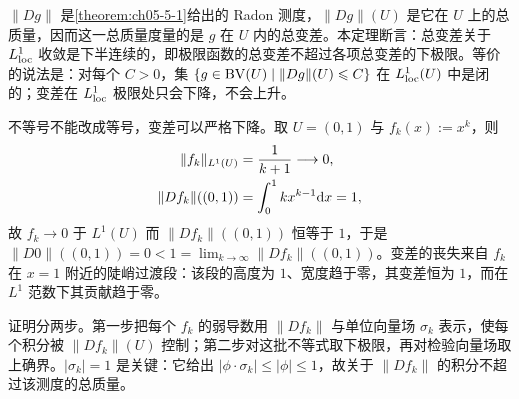 \documentclass[../../main.tex]{subfiles}%
\begin{document}
\begin{remark}\label{remark:ch05-thm-5-2-动机}
$\lVert Dg\rVert$ 是\cref{theorem:ch05-5-1}给出的 Radon 测度，$\lVert Dg\rVert(U)$ 是它在 $U$ 上的总质量，因而这一总质量度量的是 $g$ 在 $U$ 内的总变差。本定理断言：总变差关于 $L^1_{\mathrm{loc}}$ 收敛是下半连续的，即极限函数的总变差不超过各项总变差的下极限。等价的说法是：对每个 $C>0$，集 $\{g\in\mathrm{BV}(U)\mid\lVert Dg\rVert(U)\leqslant C\}$ 在 $L^1_{\mathrm{loc}}(U)$ 中是闭的；变差在 $L^1_{\mathrm{loc}}$ 极限处只会下降，不会上升。%

不等号不能改成等号，变差可以严格下降。取 $U=(0,1)$ 与 $f_k(x):=x^k$，则
\begin{align*}
\lVert f_k\rVert_{L^1(U)}&=\frac{1}{k+1}\longrightarrow0,\\
\lVert Df_k\rVert((0,1))&=\int_0^1kx^{k-1}\mathrm{d} x=1,
\end{align*}
故 $f_k\to0$ 于 $L^1(U)$ 而 $\lVert Df_k\rVert((0,1))$ 恒等于 $1$，于是 $\lVert D0\rVert((0,1))=0<1=\lim_{k\to\infty}\lVert Df_k\rVert((0,1))$。变差的丧失来自 $f_k$ 在 $x=1$ 附近的陡峭过渡段：该段的高度为 $1$、宽度趋于零，其变差恒为 $1$，而在 $L^1$ 范数下其贡献趋于零。

证明分两步。第一步把每个 $f_k$ 的弱导数用 $\lVert Df_k\rVert$ 与单位向量场 $\sigma_k$ 表示，使每个积分被 $\lVert Df_k\rVert(U)$ 控制；第二步对这批不等式取下极限，再对检验向量场取上确界。$\lvert\sigma_k\rvert=1$ 是关键：它给出 $\lvert\phi\cdot\sigma_k\rvert\leqslant\lvert\phi\rvert\leqslant1$，故关于 $\lVert Df_k\rVert$ 的积分不超过该测度的总质量。
\end{remark}
\end{document}
